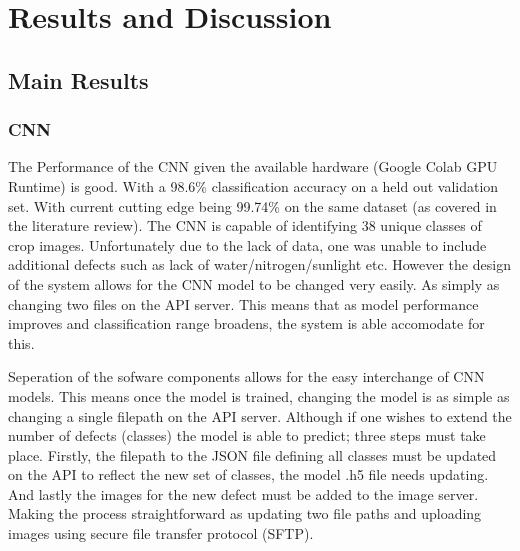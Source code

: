 \chapter{Results and Discussion}
\label{results_discussion}
\section{Main Results}
  \subsection{CNN}
    The Performance of the CNN given the available hardware (Google Colab GPU Runtime) is good. With a 98.6\% classification accuracy on a held out validation set. With current cutting edge being 99.74\% on the same dataset (as covered in the literature review). The CNN is capable of identifying 38 unique classes of crop images. Unfortunately due to the lack of data, one was unable to include additional defects such as lack of water/nitrogen/sunlight etc. However the design of the system allows for the CNN model to be changed very easily. As simply as changing two files on the API server. This means that as model performance improves and classification range broadens, the system is able accomodate for this.
    \par
    Seperation of the sofware components allows for the easy interchange of CNN models. This means once the model is trained, changing the model is as simple as changing a single filepath on the API server. Although if one wishes to extend the number of defects (classes) the model is able to predict; three steps must take place. Firstly, the filepath to the JSON file defining all classes must be updated on the API to reflect the new set of classes, the model .h5 file needs updating. And lastly the images for the new defect must be added to the image server. Making the process straightforward as updating two file paths and uploading images using secure file transfer protocol (SFTP).


